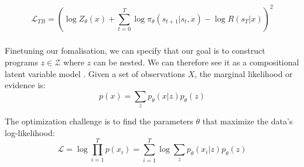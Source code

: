 \begin{equation}\label{form:TB}
     \mathcal{L}_{TB} = \left(\log Z_\theta(x) + \sum_{t=0}^{T} \log \pi_\theta(s_{t+1}|s_{t}, x) - \log R(s_T \vert x)\right)^2
\end{equation}     















\subsubsection{}
Finetuning our fomalisation, we can specify that our goal is to construct programs $z \in \mathcal{Z}$ where $z$ can be nested. We can therefore see it as a compositional latent variable model \cite{hu_gflownet-em_2023}. 
Given a set of observations \( X \), the marginal likelihood or evidence is:
\begin{equation}\label{form:evidence}
p(x) = \sum_z p_\theta (x|z) p_\theta(z)
\end{equation}

The optimization challenge is to find the parameters \( \theta \) that maximize the data's log-likelihood:
\begin{equation} %
    \mathcal{L} = \log \prod_{i=1}^{T} p(x_i) = \sum_{i=1}^{T} \log \sum_{z} p_\theta(x_i|z) p_\theta(z)
\end{equation}





